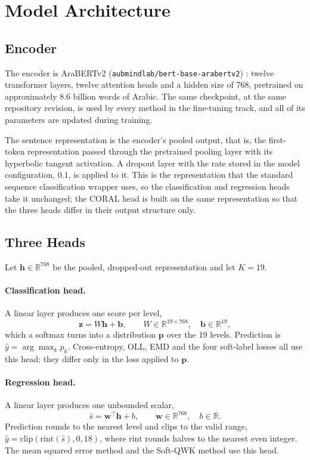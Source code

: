 \section{Model Architecture}
\label{sec:meth-heads}

\subsection{Encoder}

The encoder is AraBERTv2 (\texttt{aubmindlab/bert-base-arabertv2})
\cite{antoun2020arabert}: twelve transformer layers, twelve attention heads and a hidden size
of 768, pretrained on approximately 8.6 billion words of Arabic. The same checkpoint, at the
same repository revision, is used by every method in the fine-tuning track, and all of its
parameters are updated during training.

The sentence representation is the encoder's pooled output, that is, the first-token
representation passed through the pretrained pooling layer with its hyperbolic tangent
activation. A dropout layer with the rate stored in the model configuration, $0.1$, is applied
to it. This is the representation that the standard sequence classification wrapper uses, so
the classification and regression heads take it unchanged; the CORAL head is built on the same
representation so that the three heads differ in their output structure only.

\subsection{Three Heads}

Let $\mathbf{h} \in \mathbb{R}^{768}$ be the pooled, dropped-out representation and let $K=19$.

\paragraph{Classification head.} A linear layer produces one score per level,
\begin{equation}
\mathbf{z} = W\mathbf{h} + \mathbf{b}, \qquad W \in \mathbb{R}^{19\times768},\quad
\mathbf{b}\in\mathbb{R}^{19},
\end{equation}
which a softmax turns into a distribution $\mathbf{p}$ over the 19 levels. Prediction is
$\hat{y} = \arg\max_k p_k$. Cross-entropy, OLL, EMD and the four soft-label losses all use this
head; they differ only in the loss applied to $\mathbf{p}$.

\paragraph{Regression head.} A linear layer produces one unbounded scalar,
\begin{equation}
\hat{s} = \mathbf{w}^{\top}\mathbf{h} + b, \qquad \mathbf{w}\in\mathbb{R}^{768},\quad
b\in\mathbb{R}.
\end{equation}
Prediction rounds to the nearest level and clips to the valid range,
$\hat{y} = \mathrm{clip}(\mathrm{rint}(\hat{s}), 0, 18)$, where $\mathrm{rint}$ rounds halves
to the nearest even integer. The mean squared error method and the Soft-QWK method use this
head.

